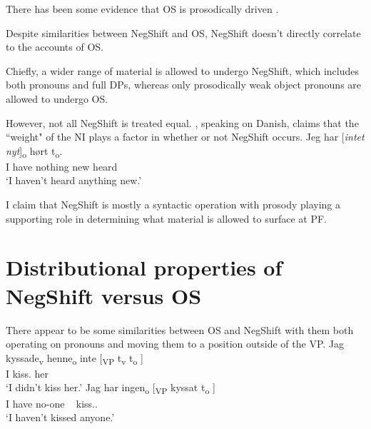 \documentclass[12pt, letterpaper]{article}
\begin{document}
\ex There has been some evidence that OS is prosodically driven \citep{erteschik-shirSoundPatternsSyntax2005,erteschik-shirScandinavianObjectShift2017,erteschik-shirVariationMainlandScandinavian2020,brinkerhoffMATCHINGPhrasesNorwegian2021}. 

\ex Despite similarities between NegShift and OS, NegShift doesn't directly correlate to the accounts of OS. 

\ex Chiefly, a wider range of material is allowed to undergo NegShift, which includes both pronouns and full DPs, whereas only prosodically weak object pronouns are allowed to undergo OS.

\ex However, not all NegShift is treated equal. \citet[65f]{christensenInterfacesNegationSyntax2005}, speaking on Danish, claims that the ``weight" of the NI plays a factor in whether or not NegShift occurs. 
	\ea
	\gll Jeg har [\textit{intet} \textit{nyt}]\textsubscript{o} hørt t\textsubscript{o}.\\
	I have nothing new heard\\
	\glt `I haven't heard anything new.'
	\z

\begin{tcolorbox}[width=\linewidth]
\centering
I claim that NegShift is mostly a syntactic operation with prosody playing a supporting role in determining what material is allowed to surface at PF. 
\end{tcolorbox}	
\z 

\section{Distributional properties of NegShift versus OS} \label{sec:ENGELS}

\ea There appear to be some similarities between OS and NegShift with them both operating on pronouns and moving them to a position outside of the VP. 
	\ea \label{ex:OS}
		\gll Jag kyssade\textsubscript{v} henne\textsubscript{o} inte [\textsubscript{VP} t\textsubscript{v} t\textsubscript{o} ] \\
		I kiss.\Pst{} her \Neg{}\\
		\glt `I didn't kiss her.'
	\ex \label{ex:NS}
		\gll Jag har ingen\textsubscript{o} [\textsubscript{VP} kyssat t\textsubscript{o} ]\\
		I have no-one ~ kiss.\Pst{}.\Ptcp{} \\
		\glt `I haven't kissed anyone.'
	\z 
	
\end{document}
